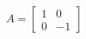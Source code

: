 \documentclass[preview]{standalone}
\begin{document}
\begin{align*}
A = \begin{bmatrix} 1 & 0 \\ 0 & -1 \end{bmatrix}
\end{align*}
\end{document}
